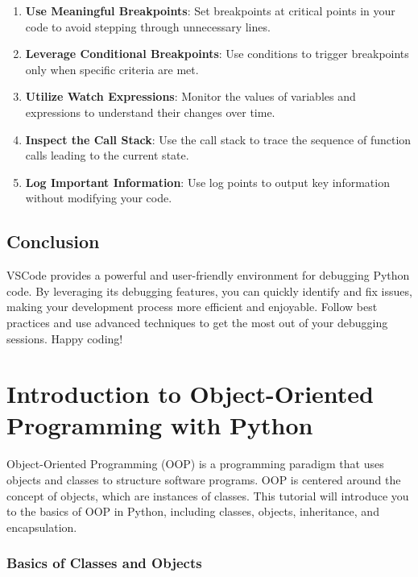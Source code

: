 \documentclass[
  letterpaper,
  DIV=11,
  numbers=noendperiod]{scrreprt}
\providecommand{\tightlist}{%
  \setlength{\itemsep}{0pt}\setlength{\parskip}{0pt}}\usepackage{longtable,booktabs,array}
\begin{document}
\begin{enumerate}
\def\labelenumi{\arabic{enumi}.}
\tightlist
\item
  \textbf{Use Meaningful Breakpoints}: Set breakpoints at critical
  points in your code to avoid stepping through unnecessary lines.
\item
  \textbf{Leverage Conditional Breakpoints}: Use conditions to trigger
  breakpoints only when specific criteria are met.
\item
  \textbf{Utilize Watch Expressions}: Monitor the values of variables
  and expressions to understand their changes over time.
\item
  \textbf{Inspect the Call Stack}: Use the call stack to trace the
  sequence of function calls leading to the current state.
\item
  \textbf{Log Important Information}: Use log points to output key
  information without modifying your code.
\end{enumerate}

\section{Conclusion}\label{conclusion-12}

VSCode provides a powerful and user-friendly environment for debugging
Python code. By leveraging its debugging features, you can quickly
identify and fix issues, making your development process more efficient
and enjoyable. Follow best practices and use advanced techniques to get
the most out of your debugging sessions. Happy coding!


\chapter{Introduction to Object-Oriented Programming with
Python}\label{introduction-to-object-oriented-programming-with-python}

Object-Oriented Programming (OOP) is a programming paradigm that uses
objects and classes to structure software programs. OOP is centered
around the concept of objects, which are instances of classes. This
tutorial will introduce you to the basics of OOP in Python, including
classes, objects, inheritance, and encapsulation.

\subsection{Basics of Classes and
Objects}\label{basics-of-classes-and-objects}
\end{document}
